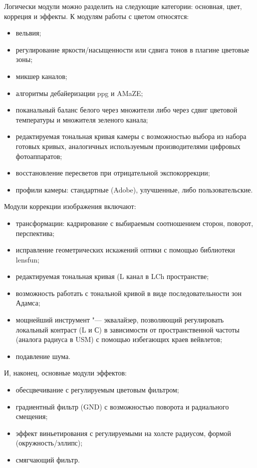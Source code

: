 \documentclass[10pt, a5paper]{article}
\begin{document}
Логически модули можно разделить на следующие категории: основная, цвет, корреция и эффекты.
К модулям работы с цветом относятся:
\begin{itemize}
\item вельвия;
\item регулирование яркости/насыщенности или сдвига тонов в плагине цветовые зоны;
\item микшер каналов;
\item алгоритмы дебайеризации ppg и AMaZE;
\item поканальный баланс белого через множители либо через сдвиг цветовой температуры и множителя зеленого канала;
\item редактируемая тональная кривая камеры с возможностью выбора из набора готовых кривых, аналогичных используемым производителями цифровых фотоаппаратов;
\item восстановление пересветов при отрицательной экспокоррекции;
\item профили камеры: стандартные (Adobe), улучшенные, либо пользовательские.
\end{itemize}
Модули коррекции изображения включают:
\begin{itemize}
\item трансформации: кадрирование с выбираемым соотношением сторон, поворот, перспектива;
\item исправление геометрических искажений оптики с помощью библиотеки lensfun;
\item редактируемая тональная кривая (L канал в LCh пространстве;
\item возможность работать с тональной кривой в виде последовательности зон Адамса;
\item мощнейший инструмент "--- эквалайзер, позволяющий регулировать локальный контраст (L и С) в зависимости от пространственной частоты (аналога радиуса в USM) с помощью избегающих краев вейвлетов;
\item подавление шума.
\end{itemize}
И, наконец, основные модули эффектов:
\begin{itemize}
\item обесцвечивание с регулируемым цветовым фильтром;
\item градиентный фильтр (GND) с возможностью поворота и радиального смещения;
\item эффект виньетирования с регулируемыми на холсте радиусом, формой (окружность/эллипс);
\item смягчающий фильтр.
\end{itemize}
\end{document}
